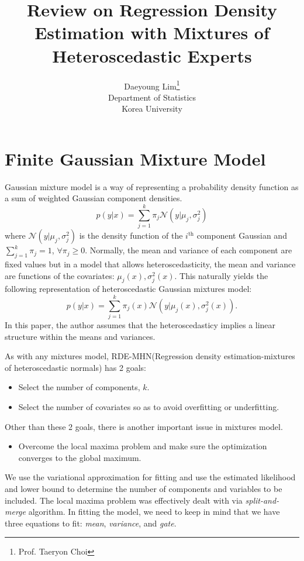 \documentclass[11pt]{article}
\begin{document}
\nocite{*}

\title{Review on Regression Density Estimation with Mixtures of Heteroscedastic Experts}

\author{Daeyoung Lim\thanks{Prof. Taeryon Choi} \\
Department of Statistics \\
Korea University}

\maketitle

\section{Finite Gaussian Mixture Model}
Gaussian mixture model is a way of representing a probability density function as a sum of weighted Gaussian component densities.
$$
  p(y|x) = \sum_{j=1}^{k}\pi_{j}\mathcal{N}\left(y| \mu_{j}, \sigma_{j}^{2} \right)
$$
where $\mathcal{N}\left(y|\mu_{j}, \sigma_{j}^{2} \right)$ is the density function of the $i^{\text{th}}$ component Gaussian and $\sum_{j=1}^{k}\pi_{j}=1$, $\forall \pi_{j}\ge 0$. Normally, the mean and variance of each component are fixed values but in a model that allows heteroscedasticity, the mean and variance are functions of the covariates: $\mu_{j}\left(x \right), \sigma_{j}^{2}\left(x \right)$. This naturally yields the following representation of heteroscedastic Gaussian mixtures model:
$$
  p(y|x) = \sum_{j=1}^{k} \pi_{j}\left(x \right) \mathcal{N}\left(y|\mu_{j}\left(x \right), \sigma_{j}^{2}\left(x \right) \right).
$$
In this paper, the author assumes that the heteroscedasticy implies a linear structure within the means and variances. \par
As with any mixtures model, RDE-MHN(Regression density estimation-mixtures of heteroscedastic normals) has 2 goals:
\begin{itemize}
  \item Select the number of components, $k$.
  \item Select the number of covariates so as to avoid overfitting or underfitting.
\end{itemize}
Other than these 2 goals, there is another important issue in mixtures model.
\begin{itemize}
  \item Overcome the local maxima problem and make sure the optimization converges to the global maximum.
\end{itemize}
We use the variational approximation for fitting and use the estimated likelihood and lower bound to determine the number of components and variables to be included. The local maxima problem was effectively dealt with via \emph{split-and-merge} algorithm. In fitting the model, we need to keep in mind that we have three equations to fit: \emph{mean}, \emph{variance}, and \emph{gate}.
\end{document}
